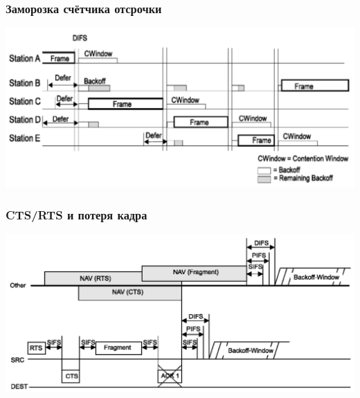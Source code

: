 \documentclass[utf8]{beamer}
\begin{document}
\begin{frame}
\frametitle{Заморозка счётчика отсрочки}
\begin{center}
 \includegraphics[width=\textwidth]{pic/backoff.png}
\end{center}
\end{frame}
\begin{frame}
\frametitle{CTS/RTS и потеря кадра}
\begin{center}
 \includegraphics[width=\textwidth]{pic/cts-rts.png}
\end{center}
\end{frame}
\end{document}
